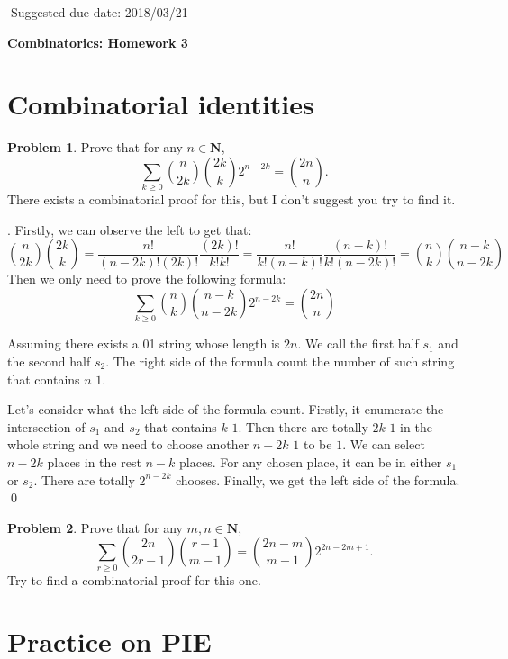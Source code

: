 \documentclass[12pt]{article}
\theoremstyle{definition}
\newtheorem{hw}{Problem}
\newenvironment{sol}
  {\par\vspace{3mm}\noindent{\it Solution}.}
  {\qed}
\newcommand{\bn}{{\mathbf N}}
\begin{document}
$\;$\hfill Suggested due date: 2018/03/21

\bigskip

\begin{center}
{\LARGE\bf Combinatorics: Homework 3}
\end{center}

\bigskip

\section{Combinatorial identities}

\begin{hw}
Prove that for any $n \in \bn$,
\[\sum_{k \geq 0} \binom{n}{2k} \binom{2k}{k} 2^{n-2k} =
  \binom{2n}{n}.\]
There exists a combinatorial proof for this, but I don't suggest you try to find it.
\end{hw}

\begin{sol}
	Firstly, we can observe the left to get that:
	$$
		\binom{n}{2k}\binom{2k}{k} = \frac{n!}{(n-2k)!(2k)!}\frac{(2k)!}{k!k!} = \frac{n!}{k!(n-k)!}\frac{(n-k)!}{k!(n-2k)!} = \binom{n}{k}\binom{n-k}{n-2k}
	$$
	Then we only need to prove the following formula:
	$$
	\sum_{k \geq 0} \binom{n}{k}\binom{n-k}{n-2k} 2^{n-2k} = \binom{2n}{n}
	$$
	
	Assuming there exists a 01 string whose length is $2n$. We call the first half $s_1$ and the second half $s_2$. The right side of the formula count the number of such string that contains $n$ $1$. 
	
	Let's consider what the left side of the formula count. Firstly, it enumerate the intersection of $s_1$ and $s_2$ that contains $k$ $1$. Then there are totally $2k$ $1$ in the whole string and we need to choose another $n - 2k$ $1$ to be $1$. We can select $n-2k$ places in the rest $n-k$ places. For any chosen place, it can be in either $s_1$ or $s_2$. There are totally $2^{n-2k}$ chooses. Finally, we get the left side of the formula.
\end{sol}

\begin{hw}
Prove that for any $m, n \in \bn$,
\[
\sum_{r \geq 0} \binom{2n}{2r-1} \binom{r-1}{m-1} = \binom{2n-m}{m-1} 2^{2n-2m+1}.
\]
Try to find a combinatorial proof for this one.
\end{hw}

\section{Practice on PIE}
\end{document}

